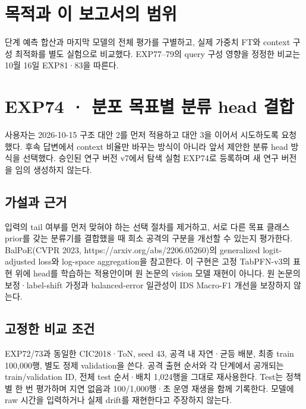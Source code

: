 




\section*{목적과 이 보고서의 범위}

단계 예측 합산과 마지막 모델의 전체 평가를 구별하고, 실제 가중치 FT와 context 구성 최적화를 별도 실험으로 비교했다. EXP77–79의 query 구성 영향을 정정한 비교는 10월 16일 EXP81·83을 따른다.


\section{EXP74 · 분포 목표별 분류 head 결합}
사용자는 2026-10-15 구조 대안 2를 먼저 적용하고 대안 3을 이어서 시도하도록 요청했다. 후속 답변에서 context 비율만 바꾸는 방식이 아니라 앞서 제안한 분류 head 방식을 선택했다. 승인된 연구 버전 v7에서 탐색 실험 EXP74로 등록하며 새 연구 버전을 임의 생성하지 않는다.

\subsection{가설과 근거}
입력의 tail 여부를 먼저 맞혀야 하는 선택 절차를 제거하고, 서로 다른 목표 클래스 prior를 갖는 분류기를 결합했을 때 희소 공격의 구분을 개선할 수 있는지 평가한다. BalPoE(CVPR 2023, https:/\allowbreak{}/\allowbreak{}arxiv.org/\allowbreak{}abs/\allowbreak{}2206.05260)의 generalized logit-adjusted loss와 log-space aggregation을 참고한다. 이 구현은 고정 TabPFN-v3의 표현 위에 head를 학습하는 적용안이며 원 논문의 vision 모델 재현이 아니다. 원 논문의 보정·label-shift 가정과 balanced-error 일관성이 IDS Macro-F1 개선을 보장하지 않는다.

\subsection{고정한 비교 조건}
EXP72/\allowbreak{}73과 동일한 CIC2018·ToN, seed 43, 공격 내 자연·균등 배분, 최종 train 100,000행, 별도 정제 validation을 쓴다. 공격 출현 순서와 각 단계에서 공개되는 train/\allowbreak{}validation ID, 전체 test 순서·배치 1,024행을 그대로 재사용한다. Test는 정책별 한 번 평가하며 지연 없음과 100/\allowbreak{}1,000행·초 운영 재생을 함께 기록한다. 모델에 raw 시간을 입력하거나 실제 drift를 재현한다고 주장하지 않는다.

